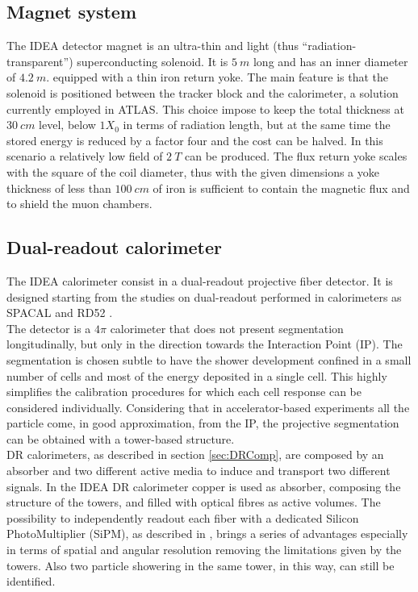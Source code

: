 \subsection{Magnet system}
The IDEA detector magnet is an ultra-thin and light (thus “radiation-transparent”) superconducting solenoid. It is $5\ m$ long and has an inner diameter of $4.2\ m$. equipped with a thin iron return yoke. The main feature is that the solenoid is positioned between the tracker block and the calorimeter, a solution currently employed in ATLAS.
This choice impose to keep the total thickness at $30\ cm$ level, below $1 X_0$  in terms of radiation length, but at the same time the stored energy is reduced by a factor four and the cost can be halved.
In this scenario a relatively low field of $2\ T$ can be produced.
The flux return yoke scales with the square of the coil diameter, thus with the given dimensions a yoke thickness of less than $100\ cm$ of iron is sufficient to contain the magnetic flux and to shield the muon chambers.

\subsection{Dual-readout calorimeter}
The IDEA calorimeter consist in a dual-readout projective fiber detector. It is designed starting from the studies on dual-readout performed in calorimeters as SPACAL \cite{SPACAL} and RD52 \cite{RD52}.\\
The detector is a $4\pi$ calorimeter that does not present segmentation longitudinally, but only in the direction towards the Interaction Point (IP).
The segmentation is chosen subtle to have the shower development confined in a small number of cells and most of the energy deposited in a single cell.
This highly simplifies the calibration procedures for which each cell response can be considered individually.
Considering that in accelerator-based experiments all the particle come, in good approximation, from the IP, the projective segmentation can be obtained with a tower-based structure.\\

DR calorimeters, as described in section \ref{sec:DRComp}, are composed by an absorber and two different active media to induce and transport two different signals. In the IDEA DR calorimeter copper is used as absorber, composing the structure of the towers, and filled with optical fibres as active volumes.
The possibility to independently readout each fiber with a dedicated Silicon  PhotoMultiplier (SiPM), as described in \cite{Massi_tesi}, brings a series of advantages especially in terms of spatial and angular resolution removing the limitations given by the towers. Also two particle showering in the same tower, in this way, can still be identified.\\

